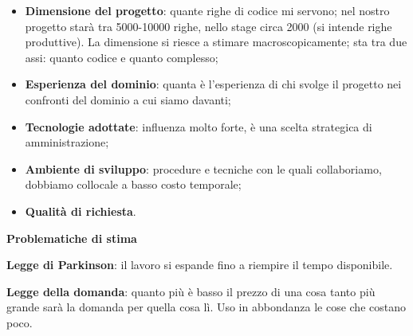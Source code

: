 \begin{itemize}

\item \textbf{Dimensione del progetto}: quante righe di codice mi servono; nel nostro progetto starà tra 5000-10000 righe, nello stage circa 2000 (si intende righe produttive). La dimensione si riesce a stimare macroscopicamente; sta tra due assi: quanto codice e quanto complesso;

\item \textbf{Esperienza del dominio}: quanta è l'esperienza di chi svolge il progetto nei confronti del dominio a cui siamo davanti;

\item \textbf{Tecnologie adottate}: influenza molto forte, è una scelta strategica di amministrazione;

\item \textbf{Ambiente di sviluppo}: procedure e tecniche con le quali collaboriamo, dobbiamo collocale a basso costo temporale;

\item \textbf{Qualità di richiesta}.

\end{itemize}

\textbf{Problematiche di stima}

\textbf{Legge di Parkinson}: il lavoro si espande fino a riempire il tempo disponibile.

\textbf{Legge della domanda}: quanto più è basso il prezzo di una cosa tanto più grande sarà la domanda per quella cosa lì. Uso in abbondanza le cose che costano poco.

